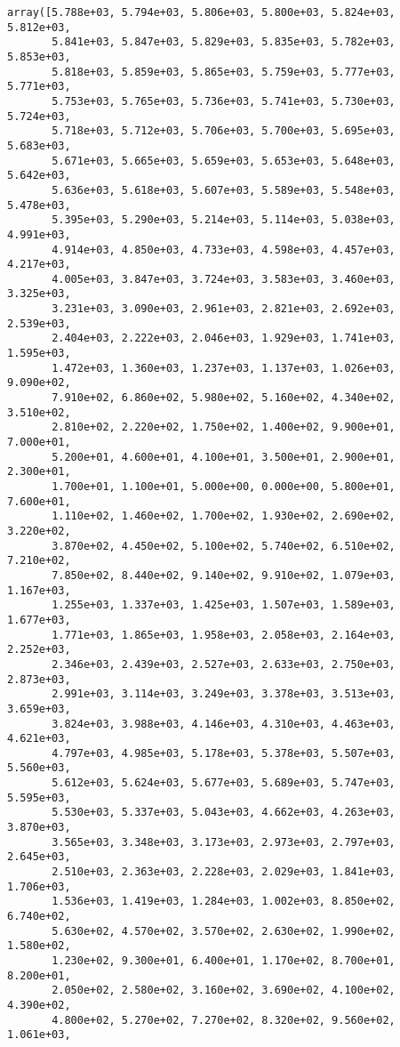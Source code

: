 \documentclass[11pt]{article}
\begin{document}
    \begin{verbatim}
array([5.788e+03, 5.794e+03, 5.806e+03, 5.800e+03, 5.824e+03, 5.812e+03,
       5.841e+03, 5.847e+03, 5.829e+03, 5.835e+03, 5.782e+03, 5.853e+03,
       5.818e+03, 5.859e+03, 5.865e+03, 5.759e+03, 5.777e+03, 5.771e+03,
       5.753e+03, 5.765e+03, 5.736e+03, 5.741e+03, 5.730e+03, 5.724e+03,
       5.718e+03, 5.712e+03, 5.706e+03, 5.700e+03, 5.695e+03, 5.683e+03,
       5.671e+03, 5.665e+03, 5.659e+03, 5.653e+03, 5.648e+03, 5.642e+03,
       5.636e+03, 5.618e+03, 5.607e+03, 5.589e+03, 5.548e+03, 5.478e+03,
       5.395e+03, 5.290e+03, 5.214e+03, 5.114e+03, 5.038e+03, 4.991e+03,
       4.914e+03, 4.850e+03, 4.733e+03, 4.598e+03, 4.457e+03, 4.217e+03,
       4.005e+03, 3.847e+03, 3.724e+03, 3.583e+03, 3.460e+03, 3.325e+03,
       3.231e+03, 3.090e+03, 2.961e+03, 2.821e+03, 2.692e+03, 2.539e+03,
       2.404e+03, 2.222e+03, 2.046e+03, 1.929e+03, 1.741e+03, 1.595e+03,
       1.472e+03, 1.360e+03, 1.237e+03, 1.137e+03, 1.026e+03, 9.090e+02,
       7.910e+02, 6.860e+02, 5.980e+02, 5.160e+02, 4.340e+02, 3.510e+02,
       2.810e+02, 2.220e+02, 1.750e+02, 1.400e+02, 9.900e+01, 7.000e+01,
       5.200e+01, 4.600e+01, 4.100e+01, 3.500e+01, 2.900e+01, 2.300e+01,
       1.700e+01, 1.100e+01, 5.000e+00, 0.000e+00, 5.800e+01, 7.600e+01,
       1.110e+02, 1.460e+02, 1.700e+02, 1.930e+02, 2.690e+02, 3.220e+02,
       3.870e+02, 4.450e+02, 5.100e+02, 5.740e+02, 6.510e+02, 7.210e+02,
       7.850e+02, 8.440e+02, 9.140e+02, 9.910e+02, 1.079e+03, 1.167e+03,
       1.255e+03, 1.337e+03, 1.425e+03, 1.507e+03, 1.589e+03, 1.677e+03,
       1.771e+03, 1.865e+03, 1.958e+03, 2.058e+03, 2.164e+03, 2.252e+03,
       2.346e+03, 2.439e+03, 2.527e+03, 2.633e+03, 2.750e+03, 2.873e+03,
       2.991e+03, 3.114e+03, 3.249e+03, 3.378e+03, 3.513e+03, 3.659e+03,
       3.824e+03, 3.988e+03, 4.146e+03, 4.310e+03, 4.463e+03, 4.621e+03,
       4.797e+03, 4.985e+03, 5.178e+03, 5.378e+03, 5.507e+03, 5.560e+03,
       5.612e+03, 5.624e+03, 5.677e+03, 5.689e+03, 5.747e+03, 5.595e+03,
       5.530e+03, 5.337e+03, 5.043e+03, 4.662e+03, 4.263e+03, 3.870e+03,
       3.565e+03, 3.348e+03, 3.173e+03, 2.973e+03, 2.797e+03, 2.645e+03,
       2.510e+03, 2.363e+03, 2.228e+03, 2.029e+03, 1.841e+03, 1.706e+03,
       1.536e+03, 1.419e+03, 1.284e+03, 1.002e+03, 8.850e+02, 6.740e+02,
       5.630e+02, 4.570e+02, 3.570e+02, 2.630e+02, 1.990e+02, 1.580e+02,
       1.230e+02, 9.300e+01, 6.400e+01, 1.170e+02, 8.700e+01, 8.200e+01,
       2.050e+02, 2.580e+02, 3.160e+02, 3.690e+02, 4.100e+02, 4.390e+02,
       4.800e+02, 5.270e+02, 7.270e+02, 8.320e+02, 9.560e+02, 1.061e+03,

\end{verbatim}
\end{document}
